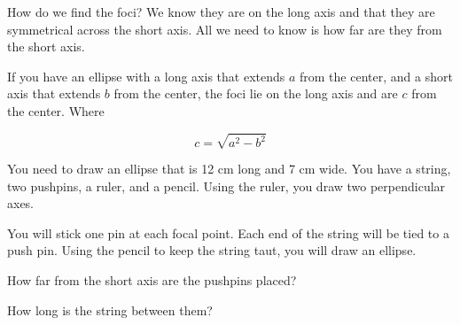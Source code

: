 How do we find the foci? We know they are on the long axis and that
they are symmetrical across the short axis. All we need to know is how
far are they from the short axis.

\begin{mdframed}[style=important, frametitle={Distance from Center to the Foci}]

If you have an ellipse with a long axis that extends $a$ from the center,
and a short axis that extends $b$ from the center, the foci
lie on the long axis and are $c$ from the center.  Where

$$c = \sqrt{a^2 - b^2}$$

\end{mdframed}

\begin{Exercise}[title={Foci of an ellipse}, label=ellipse_foci]
  
You need to draw an ellipse that is 12 cm long and 7 cm wide.  You
have a string, two pushpins, a ruler, and a pencil. Using the ruler,
you draw two perpendicular axes.

You will stick one pin at each focal point.  Each end of the string
will be tied to a push pin. Using the pencil to keep the string taut, you will draw
an ellipse.


How far from the short axis are the pushpins placed?

How long is the string between them?

\end{Exercise}
